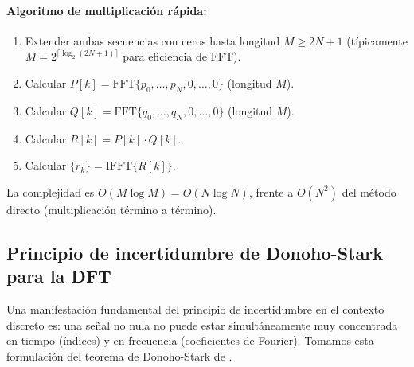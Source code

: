 \documentclass[a4paper,11pt]{report}
\begin{document}
\paragraph{Algoritmo de multiplicación rápida:}
\begin{enumerate}
\item Extender ambas secuencias con ceros hasta longitud $M \geq 2N+1$ (típicamente $M = 2^{\lceil \log_2(2N+1) \rceil}$ para eficiencia de FFT).
\item Calcular $P[k] = \text{FFT}\{p_0, \ldots, p_N, 0, \ldots, 0\}$ (longitud $M$).
\item Calcular $Q[k] = \text{FFT}\{q_0, \ldots, q_N, 0, \ldots, 0\}$ (longitud $M$).
\item Calcular $R[k] = P[k] \cdot Q[k]$.
\item Calcular $\{r_k\} = \text{IFFT}\{R[k]\}$.
\end{enumerate}

La complejidad es $O(M \log M) = O(N \log N)$, frente a $O(N^2)$ del método directo (multiplicación término a término).


\subsection{Principio de incertidumbre de Donoho-Stark para la DFT}

Una manifestación fundamental del principio de incertidumbre en el contexto discreto es: una señal no nula no puede estar simultáneamente muy concentrada en tiempo (índices) y en frecuencia (coeficientes de Fourier).
Tomamos esta formulación del teorema de Donoho-Stark de \cite{donoho1989uncertainty}.
\end{document}
